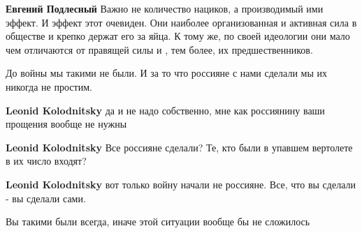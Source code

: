 \begin{itemize}
\begin{itemize}
\textbf{Евгений Подлесный} Важно не количество нациков, а производимый ими
эффект. И эффект этот очевиден. Они наиболее организованная и активная сила в
обществе и крепко держат его за яйца. К тому же, по своей идеологии они мало
чем отличаются от правящей силы и , тем более, их предшественников.

\end{itemize}

 
До войны мы такими не были. И за то что россияне с нами сделали мы их никогда
не простим.

\begin{itemize}
 
\textbf{Leonid Kolodnitsky} да и не надо собственно, мне как россиянину ваши прощения вообще не нужны

 
\textbf{Leonid Kolodnitsky} Все россияне сделали? Те, кто были в упавшем вертолете в их число входят?

 
\textbf{Leonid Kolodnitsky} вот только войну начали не россияне.
Все, что вы сделали - вы сделали сами.

 
Вы такими были всегда, иначе этой ситуации вообще бы не сложилось


\end{itemize}
\end{itemize}
